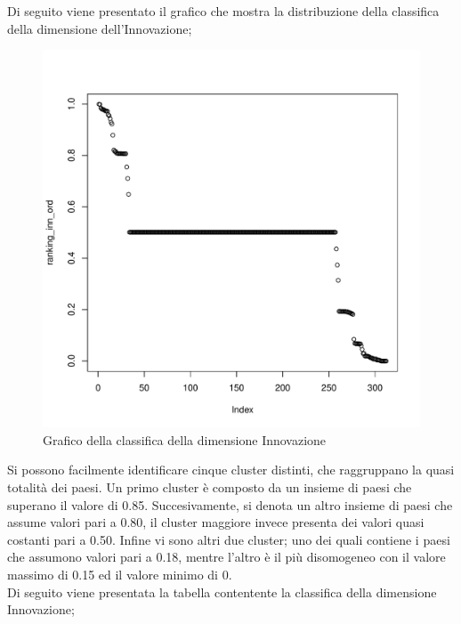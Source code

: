 \documentclass[a4paper,12pt, openright]{report}
\begin{document}
Di seguito viene presentato il grafico che mostra la distribuzione della classifica della dimensione dell'Innovazione; 

\begin{figure}[H]
    \centering
    \includegraphics[scale=.5]{ranking_inn_dorm.pdf}
    \caption{Grafico della classifica della dimensione Innovazione}
\end{figure}


Si possono facilmente identificare cinque cluster distinti, che raggruppano la quasi totalità dei paesi. 
Un primo cluster è composto da un insieme di paesi che superano il valore di 0.85. Succesivamente, 
si denota un altro insieme di paesi che assume valori pari a 0.80, il cluster maggiore invece presenta dei valori quasi costanti pari a 
0.50. Infine vi sono altri due cluster;
uno dei quali contiene i paesi che assumono valori pari a 0.18, mentre l'altro è il 
più disomogeneo 
con il valore massimo di 0.15 ed il 
valore minimo di 0. \\

Di seguito viene presentata la tabella contentente la classifica della dimensione Innovazione; 
\end{document}
